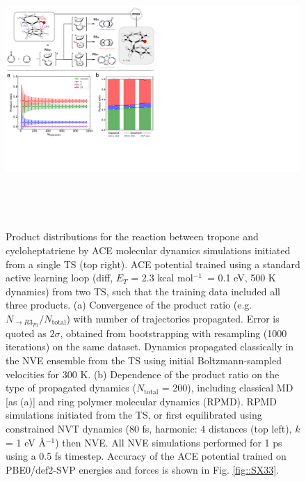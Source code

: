 \documentclass[twoside,twocolumn,9pt]{article}
\newcommand{\kcal}{kcal mol$^{-1}$}
\begin{document}
\begin{figure}[b]
	\centering
	\includegraphics[height=10.5cm]{figX2}
	\caption{Product distributions for the reaction between tropone and cycloheptatriene by ACE molecular dynamics simulations initiated from a single TS (top right). ACE potential trained using a standard active learning loop (diff, $E_T$ = 2.3 \kcal~= 0.1 eV, 500 K dynamics) from two TS, such that the training data included all three products. (a) Convergence of the product ratio (e.g. $N_{\rightarrow R3_{P1}} / N_\text{total}$) with number of trajectories propagated. Error is quoted as $2\sigma$, obtained from bootstrapping with resampling (1000 iterations) on the same dataset. Dynamics propagated classically in the NVE ensemble from the TS using initial Boltzmann-sampled velocities for 300 K. (b) Dependence of the product ratio on the type of propagated dynamics ($N_\text{total}$ = 200), including classical MD [as (a)] and ring polymer molecular dynamics (RPMD). RPMD simulations initiated from the TS, or first equilibrated using constrained NVT dynamics (80 fs, harmonic: 4 distances (top left), $k$ = 1 eV \AA${}^{-1}$) then NVE. All NVE simulations performed for 1 ps using a 0.5 fs timestep. Accuracy of the ACE potential trained on PBE0/def2-SVP energies and forces is shown in Fig. \ref{fig::SX33}.}
	\label{fig::X2}
\end{figure}
\end{document}
